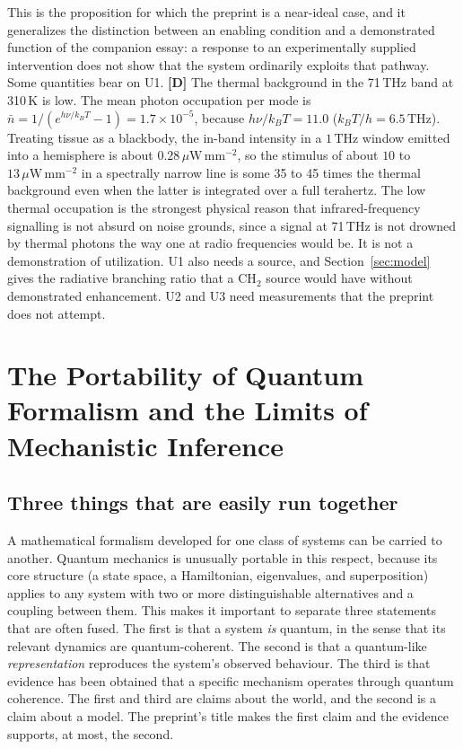 \documentclass[11pt]{article}
\newcommand{\stD}{\textbf{\textcolor{green!40!black}{[D]}}}
\newcommand{\thz}{\,\mathrm{THz}}
\theoremstyle{plain}
\theoremstyle{definition}
\theoremstyle{remark}
\begin{document}
This is the proposition for which the preprint is a near-ideal case, and it generalizes the distinction between an enabling condition and a demonstrated function of the companion essay: a response to an experimentally supplied intervention does not show that the system ordinarily exploits that pathway. Some quantities bear on U1. \stD{} The thermal background in the 71\,THz band at 310\,K is low. The mean photon occupation per mode is $\bar n=1/(e^{h\nu/k_BT}-1)=1.7\times10^{-5}$, because $h\nu/k_BT=11.0$ ($k_BT/h=6.5\thz$). Treating tissue as a blackbody, the in-band intensity in a $1\thz$ window emitted into a hemisphere is about $0.28\,\mu\mathrm{W\,mm^{-2}}$, so the stimulus of about $10$ to $13\,\mu\mathrm{W\,mm^{-2}}$ in a spectrally narrow line is some 35 to 45 times the thermal background even when the latter is integrated over a full terahertz. The low thermal occupation is the strongest physical reason that infrared-frequency signalling is not absurd on noise grounds, since a signal at 71\,THz is not drowned by thermal photons the way one at radio frequencies would be. It is not a demonstration of utilization. U1 also needs a source, and Section~\ref{sec:model} gives the radiative branching ratio that a CH$_2$ source would have without demonstrated enhancement. U2 and U3 need measurements that the preprint does not attempt.

\section{The Portability of Quantum Formalism and the Limits of Mechanistic Inference}
\label{sec:portability}

\subsection{Three things that are easily run together}

A mathematical formalism developed for one class of systems can be carried to another. Quantum mechanics is unusually portable in this respect, because its core structure (a state space, a Hamiltonian, eigenvalues, and superposition) applies to any system with two or more distinguishable alternatives and a coupling between them. This makes it important to separate three statements that are often fused. The first is that a system \emph{is} quantum, in the sense that its relevant dynamics are quantum-coherent. The second is that a quantum-like \emph{representation} reproduces the system's observed behaviour. The third is that evidence has been obtained that a specific mechanism operates through quantum coherence. The first and third are claims about the world, and the second is a claim about a model. The preprint's title makes the first claim and the evidence supports, at most, the second.
\end{document}
